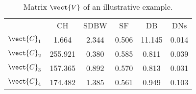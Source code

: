 \begin{table}
\centering
\begin{tabular}{cccccc}
 & CH & SDBW & SF & DB & DNs \\
$\vect{C}_1$ & 1.664 & 2.344 & 0.506 & 11.145 & 0.014 \\
$\vect{C}_2$ & 255.921 & 0.380 & 0.585 & 0.811 & 0.039 \\
$\vect{C}_3$ & 157.365 & 0.892 & 0.570 & 0.813 & 0.031 \\
$\vect{C}_4$ & 174.482 & 1.385 & 0.561 & 0.949 & 0.103 \\
\end{tabular}
\caption{Matrix $\vect{V}$ of an illustrative example.}
\label{table:tab:example:V}
\end{table}
